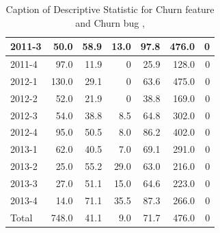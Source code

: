 \documentclass[UKenglish]{ifimaster}  %
\begin{document}
\begin{appendices}
\begin{table}[!htbp]
\begin{adjustwidth}{-1.5cm}{}
{{\begin{tabular}{ | l | r | r | r | r | r | r | }
2011-3 & 50.0 & 58.9 & 13.0 & 97.8 & 476.0 & 0\\ \hline
2011-4 & 97.0 & 11.9 & 0 & 25.9 & 128.0 & 0\\ \hline
2012-1 & 130.0 & 29.1 & 0 & 63.6 & 475.0 & 0\\ \hline
2012-2 & 52.0 & 21.9 & 0 & 38.8 & 169.0 & 0\\ \hline
2012-3 & 54.0 & 38.8 & 8.5 & 64.8 & 302.0 & 0\\ \hline
2012-4 & 95.0 & 50.5 & 8.0 & 86.2 & 402.0 & 0\\ \hline
2013-1 & 62.0 & 40.5 & 7.0 & 69.1 & 291.0 & 0\\ \hline
2013-2 & 25.0 & 55.2 & 29.0 & 63.0 & 216.0 & 0\\ \hline
2013-3 & 27.0 & 51.1 & 15.0 & 64.6 & 223.0 & 0\\ \hline
2013-4 & 14.0 & 71.1 & 35.5 & 87.3 & 266.0 & 0\\ \hline
Total & 748.0 & 41.1 & 9.0 & 71.7 & 476.0 & 0\\ \hline
\end{tabular}
}
}
\end{adjustwidth}
\caption[Optional caption for list of figures]{Caption of Descriptive Statistic for Churn feature and Churn bug , }
\label{DS:3:4}
\end{table}





\end{appendices}
\end{document}
